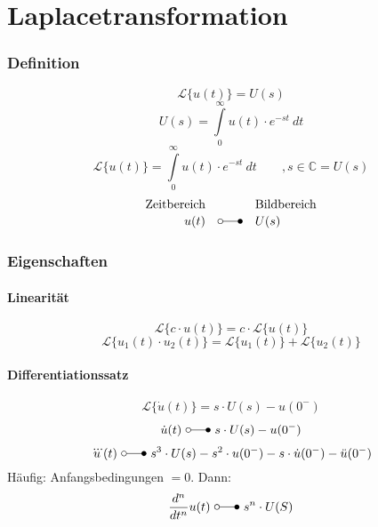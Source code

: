 



\chapter{Laplacetransformation}


\subsection{Definition}
\[ 
    \mathcal{L} \lbrace u(t) \rbrace = U(s)
\]
\[ 
    U(s) = \int\limits_{0}^{\infty} u(t) \cdot e^{-st} ~ dt 
\]
\[ 
    \mathcal{L} \lbrace u(t) \rbrace 
    = \int\limits_{0}^{\infty} u(t) \cdot e^{-st} ~ dt \qquad , s \in \mathbb{C} 
    = U(s) 
\]
\[ 
    \begin{array}{rcl}
        \text{Zeitbereich} &  & \text{Bildbereich} \\
        u(t) & \laplace & U(s)
    \end{array} 
\]

\subsection{Eigenschaften }


\subsubsection{Linearität}
\[ 
    \mathcal{L}\lbrace c \cdot u(t) \rbrace 
    = c \cdot \mathcal{L}\lbrace u(t) \rbrace 
\]
\[ 
    \mathcal{L}\lbrace u_1(t) \cdot u_2(t) \rbrace 
    = \mathcal{L}\lbrace u_1(t) \rbrace + \mathcal{L}\lbrace u_2(t) \rbrace 
\]

\subsubsection{Differentiationssatz}
\[ 
    \mathcal{L}\lbrace \dot{u}(t) \rbrace = s \cdot U(s) - u(0^-) 
\]
\[ 
    \dot{u}(t) ~ \laplace ~ s \cdot U(s) - u(0^-) 
\]
\[ 
    \dddot{u}(t) ~ \laplace ~ s^3 \cdot U(s) - s^2 \cdot u(0^-) 
    - s \cdot \dot{u}(0^-) - \ddot{u}(0^-) 
\]
Häufig: Anfangsbedingungen $= 0$.
Dann:
\[ 
    \frac{d^n}{dt^n} u(t) ~ \laplace ~ s^n \cdot U(S) 
\]


